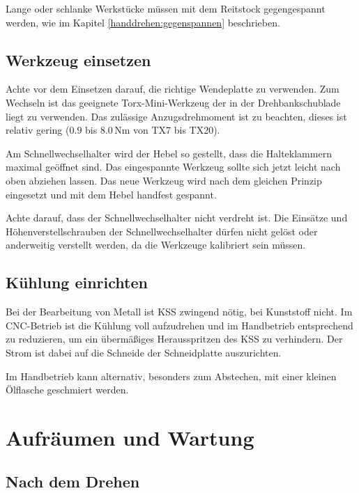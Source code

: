 \documentclass{\basedir/fablab-document}
\begin{document}
Lange oder schlanke Werkstücke müssen mit dem Reitstock gegengespannt werden,
wie im Kapitel \ref{handdrehen:gegenspannen} beschrieben.

\subsection{Werkzeug einsetzen} %
Achte vor dem Einsetzen darauf, die richtige Wendeplatte zu verwenden. Zum Wechseln ist das geeignete Torx-Mini-Werkzeug der in der Drehbankschublade liegt zu verwenden. Das zulässige Anzugsdrehmoment ist zu beachten, dieses ist relativ gering ($0.9$ bis $8.0$\,Nm von TX7 bis TX20).

Am Schnellwechselhalter wird der Hebel so gestellt, dass die Halteklammern maximal geöffnet sind.
Das eingespannte Werkzeug sollte sich jetzt leicht nach oben abziehen lassen.
Das neue Werkzeug wird nach dem gleichen Prinzip eingesetzt und mit dem Hebel handfest gespannt.

Achte darauf, dass der Schnellwechselhalter nicht verdreht ist. Die Einsätze und Höhenverstellschrauben der Schnellwechselhalter dürfen nicht gelöst oder anderweitig verstellt werden, da die Werkzeuge kalibriert sein müssen.

\subsection{Kühlung einrichten}

Bei der Bearbeitung von Metall ist KSS zwingend nötig, bei Kunststoff nicht.
Im CNC-Betrieb ist die Kühlung voll aufzudrehen und im Handbetrieb entsprechend zu reduzieren,
um ein übermäßiges Herausspritzen des KSS zu verhindern.
Der Strom ist dabei auf die Schneide der Schneidplatte auszurichten.

Im Handbetrieb kann alternativ, besonders zum Abstechen, mit einer kleinen Ölflasche geschmiert werden. 

\section{Aufräumen und Wartung}


\subsection{Nach dem Drehen}
\end{document}
